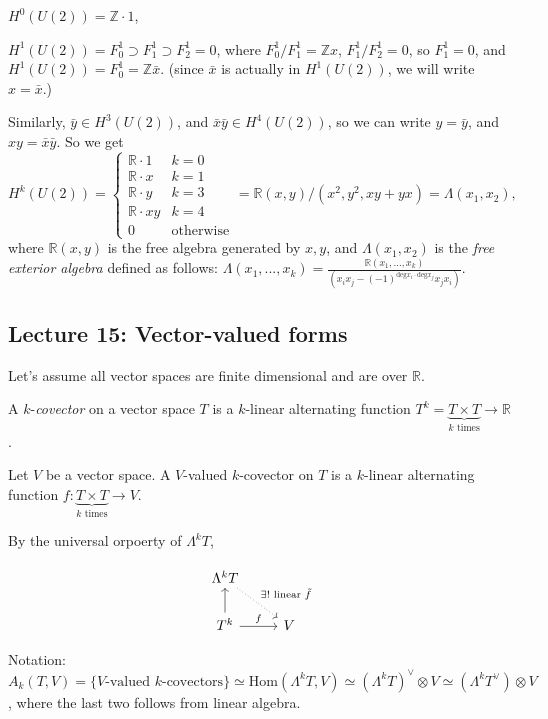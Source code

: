\documentclass{article}
\theoremstyle{mystyle}
\theoremstyle{remark}
\numberwithin{equation}{section}
\begin{document}
$H^0(U(2)) = \mathbb{Z}\cdot 1$,

$H^1(U(2)) = F^1_0\supset F^1_1 \supset F^1_2 = 0$, where $F^1_0/F^1_1 = \mathbb{Z}x$, $F^1_1/F^1_2 = 0$, so $F^1_1=0$, and $H^1(U(2)) = F^1_0 = \mathbb{Z}\bar{x}$. (since $\bar{x}$ is actually in $H^1(U(2))$, we will write $x = \bar{x}$.)

Similarly, $\bar{y} \in H^3(U(2))$, and $\bar{x}\bar{y} \in H^4(U(2))$, 
so we can write $y = \bar{y}$, and $xy = \bar{x}\bar{y}$. So we get 
$$H^k(U(2)) = \left\{\begin{array}{ll} \mathbb{R}\cdot 1 & k=0\\\mathbb{R}\cdot x & k=1 \\
\mathbb{R}\cdot y & k=3\\ 
\mathbb{R}\cdot xy & k=4 \\
0 & \text{otherwise}\end{array}\right.
= \mathbb{R}(x,y)/(x^2,y^2,xy+yx) = \Lambda(x_1,x_2),$$
where $\mathbb{R}(x,y)$ is the free algebra generated by $x,y$, and $\Lambda(x_1,x_2)$ is the \emph{free exterior algebra} defined as follows:  $\Lambda (x_1,...,x_k) = \frac{\mathbb{R}(x_1,...,x_k)}{(x_ix_j -(-1)^{\text{deg}x_i\cdot \text{deg}x_j} x_jx_i)}$. 




\subsection{Lecture 15: Vector-valued forms}

Let's assume all vector spaces are finite dimensional and are over $\mathbb{R}$.


A $k$-\emph{covector} on a vector space $T$ is a $k$-linear alternating function $T^k= \underbrace{T\times T}_{k\text{ times}}\rightarrow \mathbb{R}$.

Let $V$ be a vector space. A $V$-valued $k$-covector on $T$ is a $k$-linear alternating function $f\colon  \underbrace{T\times T}_{k\text{ times}}\rightarrow V$.

By the universal orpoerty of $\Lambda^k T$,

$$
\begin{tikzcd}
\Lambda^kT \ar[dr,dotted, "\exists!\text{ linear }\tilde{f}"] &\\
T^k\ar[u]\ar[r,"f"] &V
\end{tikzcd}
$$

Notation: $A_k(T,V) = \{V\text{-valued }k\text{-covectors}\} \simeq \mathrm{Hom}(\Lambda^kT,V) \simeq (\Lambda ^kT)^\vee \otimes V \simeq (\Lambda^kT^\vee )\otimes V$, where the last two follows from linear algebra.
\end{document}
